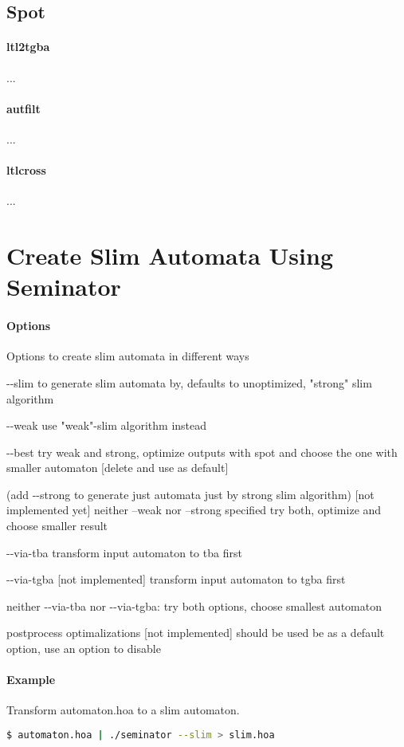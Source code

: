 \documentclass[
	digital
nolof, nolot
]{fithesis3}
\begin{document}
	\subsection{Spot}
			\paragraph{ltl2tgba}...
	\paragraph{autfilt}...
	\paragraph{ltlcross}...
		\section{Create Slim Automata Using Seminator}
		\paragraph{Options}Options to create slim automata in different ways
		
		-{}-slim to generate slim automata by, defaults to unoptimized, "strong" slim algorithm
		
		-{}-weak use "weak"-slim algorithm instead
		
		-{}-best try weak and strong, optimize outputs with spot and choose the one with smaller automaton [delete and use as default]
		
		(add -{}-strong to generate just automata just by strong slim algorithm)
		[not implemented yet] neither --weak nor --strong specified try both, optimize and choose smaller result
		
		-{}-via-tba transform input automaton to tba first
		
		-{}-via-tgba [not implemented] transform input automaton to tgba first
		
		neither -{}-via-tba nor -{}-via-tgba: try both options, choose smallest automaton
		
		postprocess optimalizations [not implemented] should be used be as a default option, use an option to disable
		
		\paragraph{Example}
		Transform automaton.hoa to a slim automaton.
		\begin{lstlisting}[language=bash]
$ automaton.hoa | ./seminator --slim > slim.hoa
		\end{lstlisting}
\end{document}
